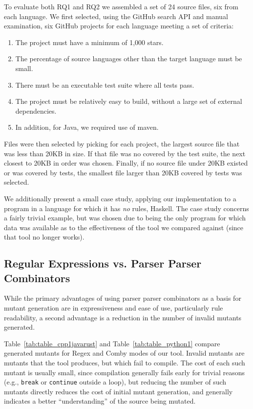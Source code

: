 \documentclass[acmsmall,screen,review,anonymous]{acmart}
\begin{document}
{To evaluate both RQ1 and RQ2 we assembled a set of 24 source files,
six from each language.  We first selected, using the GitHub search
API and manual examination, six GitHub
projects for each language meeting a set of criteria:

\begin{enumerate}
\item The project must have a minimum of 1,000 stars.
  \item The percentage of source languages other than the target
    language must be small.
  \item There must be an executable test suite where all tests pass.
    \item The project must be relatively easy to build, without a
      large set of external dependencies.
      \item In addition, for Java, we required use of maven.
      \end{enumerate}

      Files were then selected by picking for each project, the
      largest source file that was less than 20KB in size.  If that
      file was no covered by the test suite, the next closest to 20KB in order
      was chosen.  Finally, if no source file under 20KB existed or
      was covered by tests, the smallest file larger than 20KB covered
      by tests was selected.


We additionally present a small
case study, applying our implementation to a program in a language for
which it has \emph{no} rules, Haskell.  The case study concerns a
fairly trivial example, but was chosen due to being the only program
for which data was available as to the effectiveness of the tool we
compared against (since that tool no longer works).

\subsection{Regular Expressions vs. Parser Parser Combinators}

While the primary advantages of using parser parser combinators as a
basis for mutant generation are in expressiveness and ease of use,
particularly rule readability, a second advantage is a reduction in
the number of invalid mutants generated.

Table~\ref{tab:table_cpp1javarust} and Table~\ref{tab:table_python1} compare generated
mutants for Regex and Comby modes of our tool.  Invalid
mutants are mutants that the tool produces, but which fail to
compile.  The cost of each such mutant is usually small,
since compilation generally fails early for trivial reasons (e.g.,
{\tt break} or {\tt continue} outside a loop), 
but reducing the number of such mutants directly reduces the cost of
initial mutant generation, and generally indicates a better
``understanding'' of the source being mutated.

}
\end{document}
